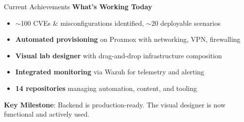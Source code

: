 \documentclass[aspectratio=169]{beamer}
\begin{document}
\begin{frame}{Current Achievements \; \faCheckCircle}
  \textbf{What's Working Today}
  \begin{itemize}
    \item \alert{$\sim$100 CVEs \& misconfigurations identified}, $\sim$20 deployable scenarios
    \item \textbf{Automated provisioning} on Proxmox with networking, VPN, firewalling
    \item \textbf{Visual lab designer} with drag-and-drop infrastructure composition
    \item \textbf{Integrated monitoring} via Wazuh for telemetry and alerting
    \item \textbf{14 repositories} managing automation, content, and tooling
  \end{itemize}
  \vspace{2mm}
  \begin{tcolorbox}
    \faLightbulb\; \textbf{Key Milestone}: Backend is production-ready. The visual designer is now functional and actively used.
  \end{tcolorbox}
\end{frame}
\end{document}

